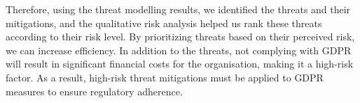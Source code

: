 Therefore, using the threat modelling results, we identified the threats and their mitigations, and the qualitative risk analysis helped us rank these threats according to their risk level. By prioritizing threats based on their perceived risk, we can increase efficiency. In addition to the threats, not complying with GDPR will result in significant financial costs for the organisation, making it a high-risk factor. As a result, high-risk threat mitigations must be applied to GDPR measures to ensure regulatory adherence. 








